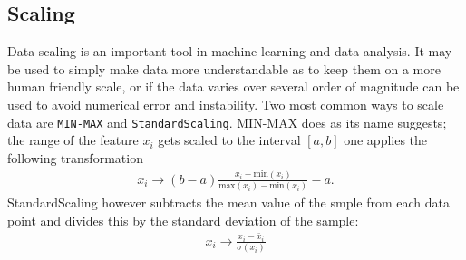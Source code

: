 \documentclass[%
reprint,
amsmath,amssymb,
aps,
pra,
]{revtex4-2}
\begin{document}
\subsection{Scaling}
Data scaling is an important tool in machine learning and data analysis. It may be used to simply make data more understandable as to keep them on a more human friendly scale, or if the data varies over several order of magnitude can be used to avoid numerical error and instability. Two most common ways to scale data are \texttt{MIN-MAX} and \texttt{StandardScaling}. MIN-MAX does as its name suggests; the range of the feature $x_i$ gets scaled to the interval $[a,b]$ one applies the following transformation
\begin{align}
	x_i\to(b-a)\frac{x_i-\text{min}(x_i)}{\text{max}(x_i)-\text{min}(x_i)}-a.
\end{align}
StandardScaling however subtracts the mean value of the smple from each data point and divides this by the standard deviation of the sample:
\begin{align}
	x_i\to\frac{x_i-\bar x_i}{\sigma(x_i)}
\end{align}
\end{document}
